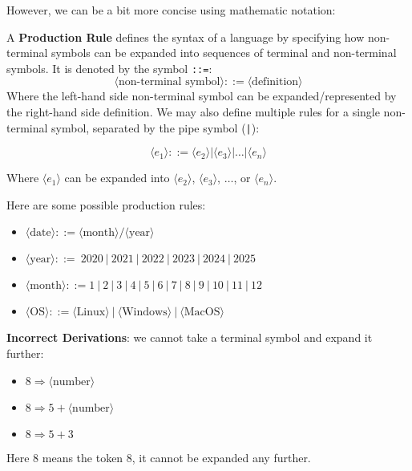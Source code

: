 \newpage

However, we can be a bit more concise using mathematic notation:

\begin{Def}[Production Rule (\texttt{::=})]
    
    \label{def:production_rule}
    A \textbf{Production Rule} defines the syntax of a language by specifying how non-terminal symbols can be expanded into
    sequences of terminal and non-terminal symbols. It is denoted by the symbol \texttt{::=}:
    \[
    \langle \text{non-terminal symbol} \rangle ::= \langle \text{definition} \rangle
    \]
    Where the left-hand side non-terminal symbol can be expanded/represented by the right-hand side definition.
    We may also define multiple rules for a single non-terminal symbol, separated by the pipe symbol (\texttt{|}):

    \[
    \langle e_1 \rangle ::= \langle e_2 \rangle | \langle e_3 \rangle | \dots | \langle e_n \rangle
    \]

    Where $\langle e_1 \rangle$ can be expanded into $\langle e_2 \rangle$, $\langle e_3 \rangle$, $\dots$, or $\langle e_n \rangle$. 
\end{Def}

\begin{Example}

    Here are some possible production rules:
    \begin{itemize}
        
        \item $\langle \text{date} \rangle ::= \langle \text{month} \rangle / \langle \text{year} \rangle$
        \item $\langle \text{year} \rangle ::=  \ 2020 \ | \ 2021 \ | \ 2022 \ | \ 2023 \ | \ 2024 \ | \ 2025$
        \item $\langle \text{month} \rangle ::= 1 \ | \ 2 \ | \ 3 \ | \ 4 \ | \ 5 \ | \ 6 \ | \ 7 \ | \ 8 \ | \ 9 \ | \ 10 \ | \ 11 \ | \ 12$
        
        \item $\langle \text{OS} \rangle ::= \langle \text{Linux} \rangle \ | \ \langle \text{Windows} \rangle \ | \ \langle \text{MacOS} \rangle$
    \end{itemize}

    \noindent
    \textbf{Incorrect Derivations}: we cannot take a terminal symbol and expand it further:
    \begin{itemize}
        \item $8 \Rightarrow \langle \text{number} \rangle$ 
        \item $8 \Rightarrow 5 + \langle \text{number} \rangle$
        \item $8 \Rightarrow 5 + 3$
    \end{itemize}

    \noindent
    Here $8$ means the token $8$, it cannot be expanded any further.
\end{Example}

